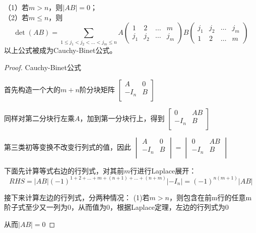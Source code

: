 \begin{theorem}{}{}
（1）若$m>n$，则$|AB|= 0$；\\
（2）若$m\leq n$，则
    \[
    \det(AB) = \sum_{1\leq j_1<j_2<\dots<j_m\leq n} 
    A\begin{pmatrix}
      1 & 2 & \dots & m \\
      j_1 & j_2 & \dots & j_m 
    \end{pmatrix}
    B\begin{pmatrix}
      j_1 & j_2 & \dots & j_m \\
      1 & 2 & \dots & m 
    \end{pmatrix}
    \]
    以上公式被成为Cauchy-Binet公式。
\end{theorem}
\begin{proof}{Cauchy-Binet公式}{}

  首先构造一个大的$m+n$阶分块矩阵
  $\begin{bmatrix}
    A & 0 \\
    -I_n & B \\
  \end{bmatrix}$

  同样对第二分块行左乘$A$，加到第一分块行上，得到
  $\begin{bmatrix}
    0 & AB \\
    -I_n & B \\
  \end{bmatrix}$

  第三类初等变换不改变行列式的值，因此
  $\begin{vmatrix}
    A & 0 \\
    -I_n & B \\
  \end{vmatrix}
  =
  \begin{vmatrix}
    0 & AB \\
    -I_n & B \\
  \end{vmatrix}$

  下面先计算等式右边的行列式，对其前$m$行进行Laplace展开：
  \[RHS=|AB|(-1)^{1+2+\dots+m+(n+1)+\dots+(n+m)}|-I_n|=(-1)^{n(m+1)}|AB|\]

  接下来计算左边的行列式，分两种情况：
  (1)若$m>n$，则包含在前m行的任意m阶子式至少又一列为0，从而值为0，根据Laplace定理，左边的行列式为0

  从而$|AB|=0$


\end{proof}
